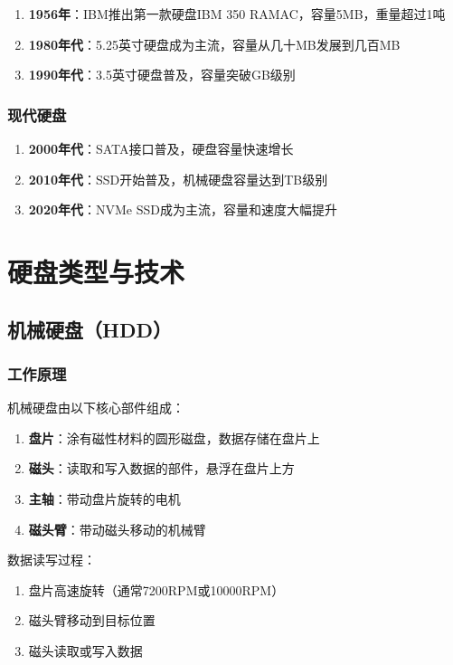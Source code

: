 \documentclass[12pt,UTF8]{ctexbook}
\begin{document}
\begin{enumerate}
    \item \textbf{1956年}：IBM推出第一款硬盘IBM 350 RAMAC，容量5MB，重量超过1吨
    \item \textbf{1980年代}：5.25英寸硬盘成为主流，容量从几十MB发展到几百MB
    \item \textbf{1990年代}：3.5英寸硬盘普及，容量突破GB级别
\end{enumerate}

\section{现代硬盘}

\begin{enumerate}
    \item \textbf{2000年代}：SATA接口普及，硬盘容量快速增长
    \item \textbf{2010年代}：SSD开始普及，机械硬盘容量达到TB级别
    \item \textbf{2020年代}：NVMe SSD成为主流，容量和速度大幅提升
\end{enumerate}

\part{硬盘类型与技术}

\chapter{机械硬盘（HDD）}

\section{工作原理}

机械硬盘由以下核心部件组成：

\begin{enumerate}
    \item \textbf{盘片}：涂有磁性材料的圆形磁盘，数据存储在盘片上
    \item \textbf{磁头}：读取和写入数据的部件，悬浮在盘片上方
    \item \textbf{主轴}：带动盘片旋转的电机
    \item \textbf{磁头臂}：带动磁头移动的机械臂
\end{enumerate}

数据读写过程：
\begin{enumerate}
    \item 盘片高速旋转（通常7200RPM或10000RPM）
    \item 磁头臂移动到目标位置
    \item 磁头读取或写入数据
\end{enumerate}
\end{document}
